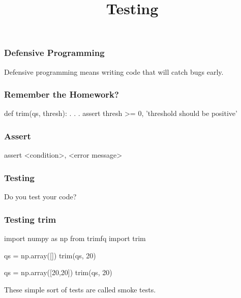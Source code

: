 
\title{Testing}
\usepackage{pgfpages}


\frame{\maketitle}

\begin{frame}[fragile]
\frametitle{Defensive Programming}

Defensive programming means writing code that will catch bugs early.
\end{frame}

\begin{frame}[fragile]
\frametitle{Remember the Homework?}

\begin{python}
def trim(qs, thresh):
    . . .
    assert thresh >= 0, 'threshold should be positive'
\end{python}
\end{frame}

\begin{frame}[fragile]
\frametitle{Assert}
\begin{python}
assert <condition>, <error message>
\end{python}

\end{frame}

\begin{frame}[fragile]
\frametitle{Testing}

Do you test your code?

\end{frame}

\begin{frame}[fragile]
\frametitle{Testing trim}
\begin{python}


import numpy as np
from trimfq import trim

qs = np.array([])
trim(qs, 20)

qs = np.array([20,20])
trim(qs, 20)
\end{python}

\pause
These simple sort of tests are called \alert{smoke tests}.
\end{frame}

